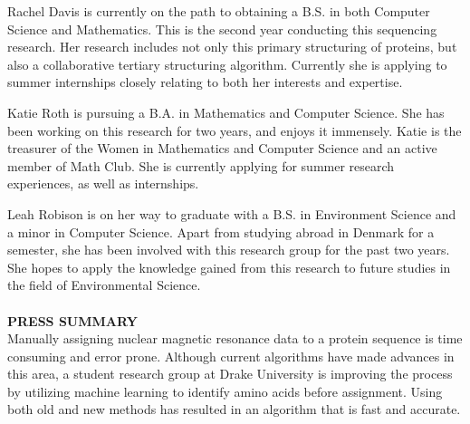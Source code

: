 \documentclass{article}
\begin{document}
Rachel Davis is currently on the path to obtaining a B.S. in both Computer Science and Mathematics. This is the second year conducting this sequencing research. Her research includes not only this primary structuring of proteins, but also a collaborative tertiary structuring algorithm. Currently she is applying to summer internships closely relating to both her interests and expertise. 

Katie Roth is pursuing a B.A. in Mathematics and Computer Science. She has been working on this research for two years, and enjoys it immensely. Katie is the treasurer of the Women in Mathematics and Computer Science and an active member of Math Club. She is currently applying for summer research experiences, as well as internships. 

Leah Robison is on her way to graduate with a B.S. in Environment Science and a minor in Computer Science. Apart from studying abroad in Denmark for a semester, she has been involved with this research group for the past two years. She hopes to apply the knowledge gained from this research to future studies in the field of Environmental Science.
\\\\
\noindent\textbf{PRESS SUMMARY}\\
Manually assigning nuclear magnetic resonance data to a protein sequence is time consuming and error prone. Although current algorithms have made advances in this area, a student research group at Drake University is improving the process by utilizing machine learning to identify amino acids before assignment. Using both old and new methods has resulted in an algorithm that is fast and accurate. 
\end{document}
